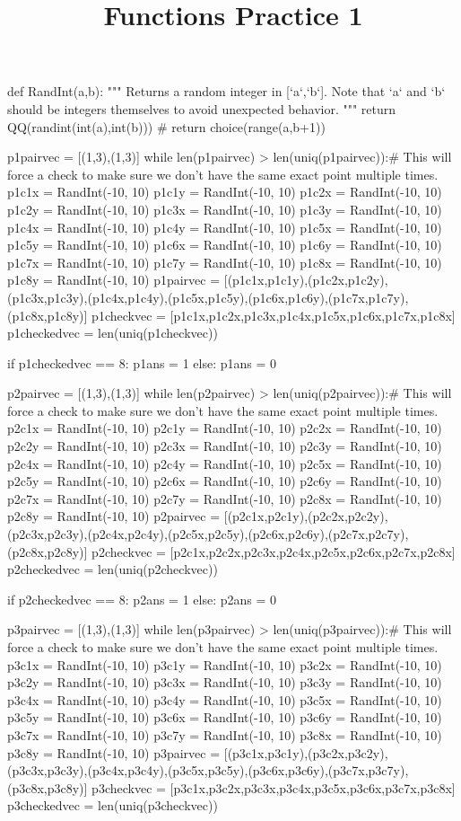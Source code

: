 \documentclass{ximera}
\title{Functions Practice 1}
\begin{document}
%
\begin{sagesilent}
def RandInt(a,b):
    """ Returns a random integer in [`a`,`b`]. Note that `a` and `b` should be integers themselves to avoid unexpected behavior.
    """
    return QQ(randint(int(a),int(b)))
    # return choice(range(a,b+1))


p1pairvec = [(1,3),(1,3)]
while len(p1pairvec) > len(uniq(p1pairvec)):# This will force a check to make sure we don't have the same exact point multiple times.
    p1c1x = RandInt(-10, 10)
    p1c1y = RandInt(-10, 10)
    p1c2x = RandInt(-10, 10)
    p1c2y = RandInt(-10, 10)
    p1c3x = RandInt(-10, 10)
    p1c3y = RandInt(-10, 10)
    p1c4x = RandInt(-10, 10)
    p1c4y = RandInt(-10, 10)
    p1c5x = RandInt(-10, 10)
    p1c5y = RandInt(-10, 10)
    p1c6x = RandInt(-10, 10)
    p1c6y = RandInt(-10, 10)
    p1c7x = RandInt(-10, 10)
    p1c7y = RandInt(-10, 10)
    p1c8x = RandInt(-10, 10)
    p1c8y = RandInt(-10, 10)
    p1pairvec = [(p1c1x,p1c1y),(p1c2x,p1c2y),(p1c3x,p1c3y),(p1c4x,p1c4y),(p1c5x,p1c5y),(p1c6x,p1c6y),(p1c7x,p1c7y),(p1c8x,p1c8y)]
p1checkvec = [p1c1x,p1c2x,p1c3x,p1c4x,p1c5x,p1c6x,p1c7x,p1c8x]
p1checkedvec = len(uniq(p1checkvec))

if p1checkedvec == 8:
    p1ans = 1
else:
    p1ans = 0

p2pairvec = [(1,3),(1,3)]
while len(p2pairvec) > len(uniq(p2pairvec)):# This will force a check to make sure we don't have the same exact point multiple times.
    p2c1x = RandInt(-10, 10)
    p2c1y = RandInt(-10, 10)
    p2c2x = RandInt(-10, 10)
    p2c2y = RandInt(-10, 10)
    p2c3x = RandInt(-10, 10)
    p2c3y = RandInt(-10, 10)
    p2c4x = RandInt(-10, 10)
    p2c4y = RandInt(-10, 10)
    p2c5x = RandInt(-10, 10)
    p2c5y = RandInt(-10, 10)
    p2c6x = RandInt(-10, 10)
    p2c6y = RandInt(-10, 10)
    p2c7x = RandInt(-10, 10)
    p2c7y = RandInt(-10, 10)
    p2c8x = RandInt(-10, 10)
    p2c8y = RandInt(-10, 10)
    p2pairvec = [(p2c1x,p2c1y),(p2c2x,p2c2y),(p2c3x,p2c3y),(p2c4x,p2c4y),(p2c5x,p2c5y),(p2c6x,p2c6y),(p2c7x,p2c7y),(p2c8x,p2c8y)]
p2checkvec = [p2c1x,p2c2x,p2c3x,p2c4x,p2c5x,p2c6x,p2c7x,p2c8x]
p2checkedvec = len(uniq(p2checkvec))

if p2checkedvec == 8:
    p2ans = 1
else:
    p2ans = 0

p3pairvec = [(1,3),(1,3)]
while len(p3pairvec) > len(uniq(p3pairvec)):# This will force a check to make sure we don't have the same exact point multiple times.
    p3c1x = RandInt(-10, 10)
    p3c1y = RandInt(-10, 10)
    p3c2x = RandInt(-10, 10)
    p3c2y = RandInt(-10, 10)
    p3c3x = RandInt(-10, 10)
    p3c3y = RandInt(-10, 10)
    p3c4x = RandInt(-10, 10)
    p3c4y = RandInt(-10, 10)
    p3c5x = RandInt(-10, 10)
    p3c5y = RandInt(-10, 10)
    p3c6x = RandInt(-10, 10)
    p3c6y = RandInt(-10, 10)
    p3c7x = RandInt(-10, 10)
    p3c7y = RandInt(-10, 10)
    p3c8x = RandInt(-10, 10)
    p3c8y = RandInt(-10, 10)
    p3pairvec = [(p3c1x,p3c1y),(p3c2x,p3c2y),(p3c3x,p3c3y),(p3c4x,p3c4y),(p3c5x,p3c5y),(p3c6x,p3c6y),(p3c7x,p3c7y),(p3c8x,p3c8y)]
p3checkvec = [p3c1x,p3c2x,p3c3x,p3c4x,p3c5x,p3c6x,p3c7x,p3c8x]
p3checkedvec = len(uniq(p3checkvec))


\end{sagesilent}
\end{document}
